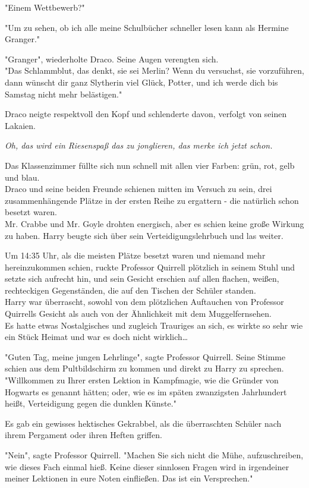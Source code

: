 {"Einem Wettbewerb?"

"Um zu sehen, ob ich alle meine Schulbücher schneller lesen kann als Hermine Granger."

"Granger", wiederholte Draco. Seine Augen verengten sich.\\ "Das Schlammblut, das denkt, sie sei Merlin? Wenn du versuchst, sie vorzuführen, dann wünscht dir ganz Slytherin viel Glück, Potter, und ich werde dich bis Samstag nicht mehr belästigen."

Draco neigte respektvoll den Kopf und schlenderte davon, verfolgt von seinen Lakaien.

\emph{Oh, das wird ein Riesenspaß das zu jonglieren, das merke ich jetzt schon.}

Das Klassenzimmer füllte sich nun schnell mit allen vier Farben: grün, rot, gelb und blau.\\ Draco und seine beiden Freunde schienen mitten im Versuch zu sein, drei zusammenhängende Plätze in der ersten Reihe zu ergattern - die natürlich schon besetzt waren.\\ Mr. Crabbe und Mr. Goyle drohten energisch, aber es schien keine große Wirkung zu haben. Harry beugte sich über sein Verteidigungslehrbuch und las weiter.

Um 14:35 Uhr, als die meisten Plätze besetzt waren und niemand mehr hereinzukommen schien, ruckte Professor Quirrell plötzlich in seinem Stuhl und setzte sich aufrecht hin, und sein Gesicht erschien auf allen flachen, weißen, rechteckigen Gegenständen, die auf den Tischen der Schüler standen.\\ Harry war überrascht, sowohl von dem plötzlichen Auftauchen von Professor Quirrells Gesicht als auch von der Ähnlichkeit mit dem Muggelfernsehen.\\ Es hatte etwas Nostalgisches und zugleich Trauriges an sich, es wirkte so sehr wie ein Stück Heimat und war es doch nicht wirklich…

"Guten Tag, meine jungen Lehrlinge", sagte Professor Quirrell. Seine Stimme schien aus dem Pultbildschirm zu kommen und direkt zu Harry zu sprechen.\\ "Willkommen zu Ihrer ersten Lektion in Kampfmagie, wie die Gründer von Hogwarts es genannt hätten; oder, wie es im späten zwanzigsten Jahrhundert heißt, Verteidigung gegen die dunklen Künste."

Es gab ein gewisses hektisches Gekrabbel, als die überraschten Schüler nach ihrem Pergament oder ihren Heften griffen.

"Nein", sagte Professor Quirrell. "Machen Sie sich nicht die Mühe, aufzuschreiben, wie dieses Fach einmal hieß. Keine dieser sinnlosen Fragen wird in irgendeiner meiner Lektionen in eure Noten einfließen. Das ist ein Versprechen."

}
